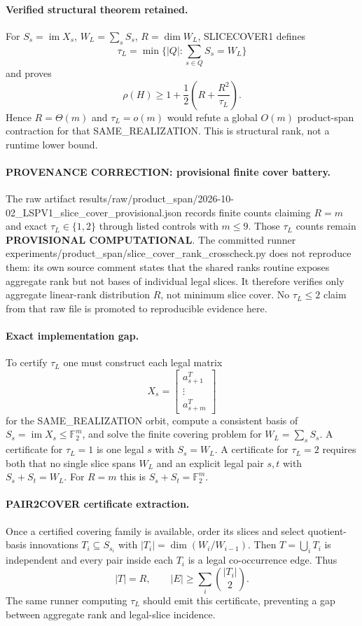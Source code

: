 \documentclass[11pt]{article}
\begin{document}
\paragraph{Verified structural theorem retained.}
For $S_s=\operatorname{im}X_s$, $W_L=\sum_sS_s$, $R=\dim W_L$, SLICECOVER1 defines
\[\tau_L=\min\{|Q|:\sum_{s\in Q}S_s=W_L\}\]
and proves
\[\boxed{\rho(H)\ge1+\frac12\left(R+\frac{R^2}{\tau_L}\right).}\]
Hence $R=\Theta(m)$ and $\tau_L=o(m)$ would refute a global $O(m)$ product-span contraction for that SAME_REALIZATION. This is structural rank, not a runtime lower bound.

\paragraph{PROVENANCE CORRECTION: provisional finite cover battery.}
The raw artifact results/raw/product_span/2026-10-02_LSPV1_slice_cover_provisional.json records finite counts claiming $R=m$ and exact $\tau_L\in\{1,2\}$ through listed controls with $m\le9$. Those $\tau_L$ counts remain \textbf{PROVISIONAL COMPUTATIONAL}. The committed runner experiments/product_span/slice_cover_rank_crosscheck.py does not reproduce them: its own source comment states that the shared ranks routine exposes aggregate rank but not bases of individual legal slices. It therefore verifies only aggregate linear-rank distribution $R$, not minimum slice cover. No $\tau_L\le2$ claim from that raw file is promoted to reproducible evidence here.

\paragraph{Exact implementation gap.}
To certify $\tau_L$ one must construct each legal matrix
\[X_s=\begin{bmatrix}a_{s+1}^{T}\\ \vdots\\ a_{s+m}^{T}\end{bmatrix}\]
for the SAME_REALIZATION orbit, compute a consistent basis of $S_s=\operatorname{im}X_s\le\mathbb F_2^m$, and solve the finite covering problem for $W_L=\sum_sS_s$. A certificate for $\tau_L=1$ is one legal $s$ with $S_s=W_L$. A certificate for $\tau_L=2$ requires both that no single slice spans $W_L$ and an explicit legal pair $s,t$ with $S_s+S_t=W_L$. For $R=m$ this is $S_s+S_t=\mathbb F_2^m$.

\paragraph{PAIR2COVER certificate extraction.}
Once a certified covering family is available, order its slices and select quotient-basis innovations $T_i\subseteq S_{s_i}$ with $|T_i|=\dim(W_i/W_{i-1})$. Then $T=\bigcup_iT_i$ is independent and every pair inside each $T_i$ is a legal co-occurrence edge. Thus
\[|T|=R,\qquad |E|\ge\sum_i\binom{|T_i|}{2}.\]
The same runner computing $\tau_L$ should emit this certificate, preventing a gap between aggregate rank and legal-slice incidence.
\end{document}
